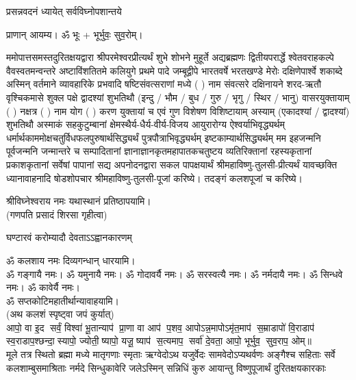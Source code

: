 {प्रसन्नवदनं ध्यायेत् सर्वविघ्नोपशान्तये}
 
प्राणान्  आयम्य।  ॐ भूः + भूर्भुवः॒ सुव॒रोम्।


ममोपात्तसमस्तदुरितक्षयद्वारा श्रीपरमेश्वरप्रीत्यर्थं शुभे शोभने मुहूर्ते अद्यब्रह्मणः
द्वितीयपरार्द्धे श्वेतवराहकल्पे वैवस्वतमन्वन्तरे अष्टाविंशतितमे कलियुगे प्रथमे पादे
जम्बूद्वीपे भारतवर्षे भरतखण्डे मेरोः दक्षिणेपार्श्वे शकाब्दे अस्मिन् वर्तमाने व्यावहारिके
 प्रभवादि षष्टिसंवत्सराणां मध्ये (  ) नाम संवत्सरे दक्षिनायने
शरद-ऋतौ  वृश्चिकमासे शुक्ल पक्षे द्वादश्यां शुभतिथौ
(इन्दु / भौम / बुध / गुरु / भृगु / स्थिर / भानु) वासरयुक्तायाम्
(  ) नक्षत्र (  ) नाम  योग  (  ) करण युक्तायां च एवं गुण विशेषण विशिष्टायाम्
अस्याम् (एकादश्यां / द्वादश्यां) शुभतिथौ
अस्माकं सहकुटुम्बानां क्षेमस्थैर्य-धैर्य-वीर्य-विजय आयुरारोग्य ऐश्वर्याभिवृद्ध्यर्थम्
 धर्मार्थकाममोक्ष\-चतुर्विधफलपुरुषार्थसिद्ध्यर्थं पुत्रपौत्राभि\-वृद्ध्यर्थम् इष्टकाम्यार्थसिद्ध्यर्थम्
मम इहजन्मनि पूर्वजन्मनि जन्मान्तरे च सम्पादितानां ज्ञानाज्ञानकृतमहा\-पातकचतुष्टय
व्यतिरिक्तानां रहस्यकृतानां प्रकाशकृतानां सर्वेषां पापानां सद्य अपनोदनद्वारा सकल
पापक्षयार्थं श्रीमहाविष्णु-तुलसी-प्रीत्यर्थं यावच्छक्ति ध्यानावाहनादि
षोडशोपचार श्रीमहाविष्णु-तुलसी-पूजां करिष्ये। तदङ्गं कलशपूजां च करिष्ये।


श्रीविघ्नेश्वराय नमः यथास्थानं प्रतिष्ठापयामि।\\
(गणपति प्रसादं शिरसा गृहीत्वा)


{घण्टारवं करोम्यादौ देवताऽऽह्वानकारणम्}

ॐ कलशाय नमः दिव्यगन्धान् धारयामि।\\
ॐ गङ्गायै नमः। ॐ यमुनायै नमः। ॐ गोदावर्यै नमः।  ॐ सरस्वत्यै नमः। ॐ नर्मदायै नमः। ॐ सिन्धवे नमः। ॐ कावेर्यै नमः।\\
 ॐ सप्तकोटिमहातीर्थान्यावाहयामि। \\

(अथ कलशं स्पृष्ट्वा जपं कुर्यात्) \\
आपो॒ वा इ॒द सर्वं॒ विश्वा॑ भू॒तान्याप॑ प्रा॒णा वा आप॑ प॒शव॒ आपो\-ऽन्न॒मापोऽमृ॑त॒माप॑ स॒म्राडापो॑ वि॒राडाप॑ स्व॒राडाप॒श्\-छन्दा॒स्यापो॒ ज्योती॒ष्यापो॒ यजू॒ष्याप॑ स॒त्यमाप॒ सर्वा॑ दे॒वता॒ आपो॒ भूर्भुव॒ सुव॒राप॒ ओम्॥\\

{मूले तत्र स्थितो ब्रह्मा मध्ये मातृगणाः स्मृताः}
{ऋग्वेदोऽथ यजुर्वेदः सामवेदोऽप्यथर्वणः}
{अङ्गैश्च सहिताः सर्वे कलशाम्बुसमाश्रिताः}
{नर्मदे सिन्धुकावेरि जलेऽस्मिन् सन्निधिं कुरु}
{आयान्तु विष्णुपूजार्थं दुरितक्षयकारकाः}


